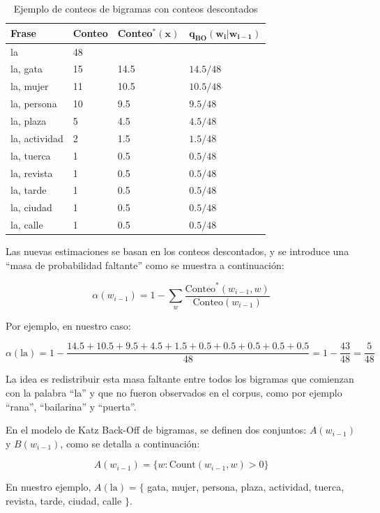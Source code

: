 \documentclass[11pt,fleqn]{book} %
\begin{document}
\begin{table}[h]
    \centering
    \begin{tabular}{|l|l|l|l|}\hline
        \textbf{Frase} & \textbf{Conteo} & \textbf{Conteo}$\mathbf{^*(x)}$ & $\mathbf{q_{\text{BO}}(w_i | w_{i-1})}$ \\
        \hline
        la & 48 & & \\
        la, gata & 15 & 14.5 & $14.5/48$ \\
        la, mujer & 11 & 10.5 & $10.5/48$ \\
        la, persona & 10 & 9.5 & $9.5/48$ \\
        la, plaza & 5 & 4.5 & $4.5/48$ \\
        la, actividad & 2 & 1.5 & $1.5/48$ \\
        la, tuerca & 1 & 0.5 & $0.5/48$ \\
        la, revista & 1 & 0.5 & $0.5/48$ \\
        la, tarde & 1 & 0.5 & $0.5/48$ \\
        la, ciudad & 1 & 0.5 & $0.5/48$ \\
        la, calle & 1 & 0.5 & $0.5/48$ \\\hline
    \end{tabular}\caption{Ejemplo de conteos de bigramas con conteos descontados}\label{tab:plm_ej}
\end{table}

Las nuevas estimaciones se basan en los conteos descontados, y se introduce una ``masa de probabilidad faltante'' como se muestra a continuación:

\[
\alpha(w_{i-1}) = 1 - \sum_{w} \frac{\text{Conteo}^*(w_{i-1}, w)}{\text{Conteo}(w_{i-1})}
\]

Por ejemplo, en nuestro caso:

\[
\alpha(\text{la}) = 1 - \frac{14.5+10.5+9.5+4.5+1.5+0.5+0.5+0.5+0.5+0.5}{48} = 1-\frac{43}{48} = \frac{5}{48}
\]

La idea es redistribuir esta masa faltante entre todos los bigramas que comienzan con la palabra ``la'' y que no fueron observados en el corpus, como por ejemplo ``rana'', ``bailarina'' y ``puerta''.

En el modelo de Katz Back-Off de bigramas, se definen dos conjuntos: $A(w_{i-1})$ y $B(w_{i-1})$, como se detalla a continuación:

\[
A(w_{i-1}) = \{w : \text{Count}(w_{i-1}, w) > 0\}
\]

En nuestro ejemplo, $A(\text{la}) = \{$ gata, mujer, persona, plaza, actividad, tuerca, revista, tarde, ciudad, calle $\}$.
\end{document}
